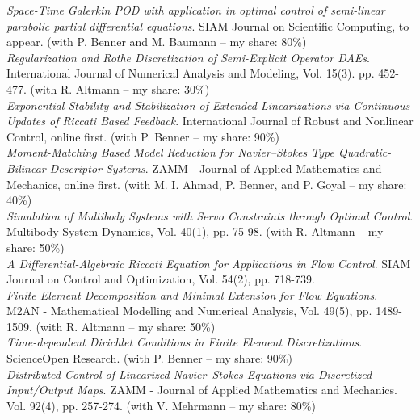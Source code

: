  \emph{Space-Time Galerkin POD with application in optimal control of semi-linear parabolic partial differential equations}. SIAM Journal on Scientific Computing, to appear. (with P. Benner and M. Baumann -- my share: 80\%) \\

 \emph{Regularization and Rothe Discretization of Semi-Explicit Operator DAEs}. International Journal of Numerical Analysis and Modeling, Vol. 15(3). pp. 452-477. (with R. Altmann -- my share: 30\%) \\

 \emph{Exponential Stability and Stabilization of Extended Linearizations via Continuous Updates of Riccati Based Feedback}. International Journal of Robust and Nonlinear Control, online first. (with P. Benner -- my share: 90\%) \\

 \emph{Moment-Matching Based Model Reduction for Navier--Stokes Type Quadratic-Bilinear Descriptor Systems}. ZAMM - Journal of Applied Mathematics and Mechanics, online first. (with M. I. Ahmad, P. Benner, and P. Goyal -- my share: 40\%) \\

 \emph{Simulation of Multibody Systems with Servo Constraints through Optimal Control}. Multibody System Dynamics, Vol. 40(1), pp. 75-98. (with R. Altmann -- my share: 50\%) \\

 \emph{A Differential-Algebraic Riccati Equation for Applications in Flow Control}. SIAM Journal on Control and Optimization, Vol. 54(2), pp. 718-739.\\

 \emph{Finite Element Decomposition and Minimal Extension for Flow Equations}. M2AN - Mathematical Modelling and Numerical Analysis, Vol. 49(5), pp. 1489-1509. (with R. Altmann -- my share: 50\%) \\

 \emph{Time-dependent Dirichlet Conditions in Finite Element Discretizations}. ScienceOpen Research. (with P. Benner -- my share: 90\%)\\

 \emph{Distributed Control of Linearized Navier--Stokes Equations via Discretized Input/Output Maps}. ZAMM - Journal of Applied Mathematics and Mechanics. Vol. 92(4), pp. 257-274. (with V. Mehrmann -- my share: 80\%) 


